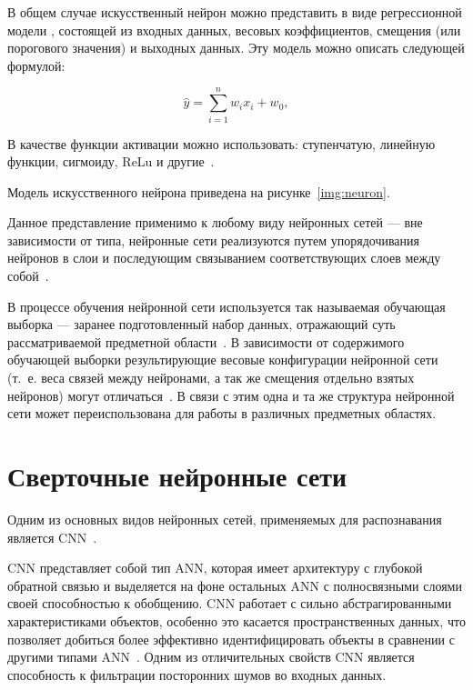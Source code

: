 
В общем случае искусственный нейрон можно представить в виде регрессионной модели \cite{activationfuncs}, состоящей из входных данных, весовых коэффициентов, смещения (или порогового значения) и выходных данных. Эту модель можно описать следующей формулой:

\begin{equation}
	\label{eq:nn0}
	\hat{y} = \sum_{i=1}^{n}w_ix_i + w_0,
\end{equation}

В качестве функции активации можно использовать: ступенчатую, линейную функции, сигмоиду, ReLu и другие~\cite{activationfuncs}.

Модель искусственного нейрона приведена на рисунке~\ref{img:neuron}.


Данное представление применимо к любому виду нейронных сетей --- вне зависимости от типа, нейронные сети реализуются путем упорядочивания нейронов в слои и последующим связыванием соответствующих слоев между собой~\cite{ann}.

В процессе обучения нейронной сети используется так называемая обучающая выборка --- заранее подготовленный набор данных, отражающий суть рассматриваемой предметной области~\cite{ann}. В зависимости от содержимого обучающей выборки результирующие весовые конфигурации нейронной сети (т.~е. веса связей между нейронами, а так же смещения отдельно взятых нейронов) могут отличаться~\cite{ann}. В связи с этим одна и та же структура нейронной сети может переиспользована для работы в различных предметных областях.

\section{Сверточные нейронные сети}

Одним из основных видов нейронных сетей, применяемых для распознавания является CNN~\cite{cnn}.

CNN представляет собой тип ANN, которая имеет архитектуру с глубокой обратной связью и выделяется на фоне остальных ANN с полносвязными слоями своей способностью к обобщению. CNN работает с сильно абстрагированными характеристиками объектов, особенно это касается пространственных данных, что позволяет добиться более эффективно идентифицировать объекты в сравнении с другими типами ANN~\cite{cnn}. Одним из отличительных свойств CNN является способность к фильтрации посторонних шумов во входных данных.

